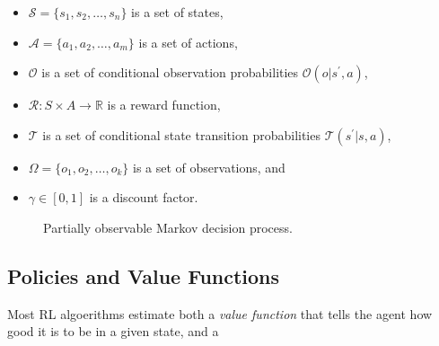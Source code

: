 \begin{itemize}
    \item \(\mathcal{S} = \{ s_1, s_2, \dots, s_n \}\) is a set of states,
    \item \(\mathcal{A} = \{ a_1, a_2, \dots, a_m \}\) is a set of actions,
    \item \(\mathcal{O}\) is a set of conditional observation probabilities \(\mathcal{O}(o | s^\prime, a)\),
    \item \(\mathcal{R} : S \times A \rightarrow \mathbb{R}\) is a reward function,
    \item \(\mathcal{T}\) is a set of conditional state transition probabilities \(\mathcal{T}(s^\prime | s, a)\),
    \item \(\Omega = \{ o_1, o_2, \dots, o_k \}\) is a set of observations, and
    \item \(\gamma \in [0, 1]\) is a discount factor.
\end{itemize}


\begin{figure}
    \centering
    \label{fig:pomdp}
    \caption{Partially observable Markov decision process.}
\end{figure}

\subsection{Policies and Value Functions}

Most RL algoerithms estimate both a \textit{value function} that tells the agent how good it is to be in a given state, and a 


